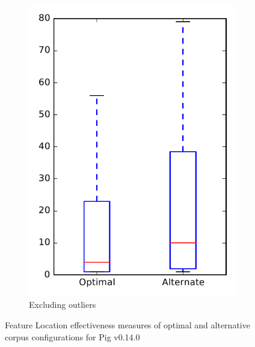 \begin{figure}
\begin{subfigure}{.4\textwidth}
        \includegraphics[height=0.4\textheight]{figures/combo/flt_rq2_pig_no_outlier}
        \caption{Excluding outliers}\label{fig:combo:flt:rq2:pig_no_outlier}
    \end{subfigure}
\caption{Feature Location effectiveness measures of optimal and alternative corpus configurations for Pig v0.14.0}
\label{fig:combo:flt:rq2:pig}
\end{figure}
